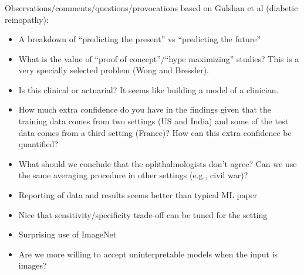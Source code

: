 \documentclass[aspectratio=169]{beamer}
\begin{document}
\begin{frame}
\frametitle{}

Observations/comments/questions/provocations based on Gulshan et al (diabetic reinopathy):
\begin{itemize}
\item A breakdown of ``predicting the present'' vs ``predicting the future''
\pause
\item What is the value of ``proof of concept''/``hype maximizing'' studies?  This is a very specially selected problem (Wong and Bressler).
\pause
\item Is this clinical or actuarial? It seems like building a model of a clinician. 
\pause
\item How much extra confidence do you have in the findings given that the training data comes from two settings (US and India) and some of the test data comes from a third setting (France)?  How can this extra confidence be quantified?
\pause
\item What should we conclude that the ophthalmologists don't agree? Can we use the same averaging procedure in other settings (e.g., civil war)?
\pause
\item Reporting of data and results seems better than typical ML paper
\pause
\item Nice that sensitivity/specificity trade-off can be tuned for the setting
\pause
\item Surprising use of ImageNet
\pause
\item Are we more willing to accept uninterpretable models when the input is images?
\end{itemize}

\end{frame}
\frame{\titlepage}
\end{document}
